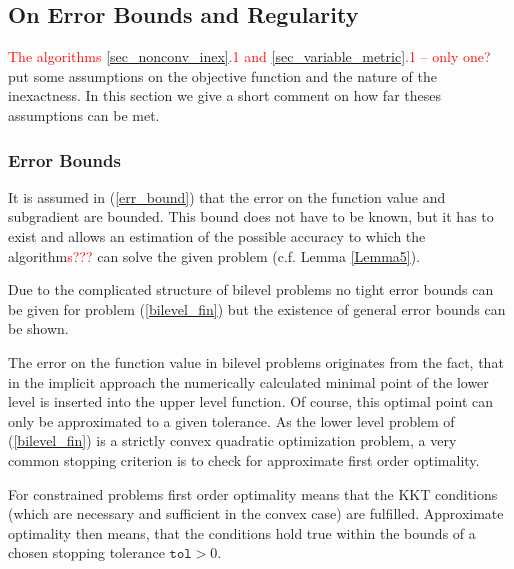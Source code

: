 
%


\subsection{On Error Bounds and Regularity}

\textcolor{red}{The algorithms \ref{sec_nonconv_inex}.1 and \ref{sec_variable_metric}.1 -- only one? } put some assumptions on the objective function and the nature of the inexactness. In this section we give a short comment on how far theses assumptions can be met.


\subsubsection{Error Bounds}

It is assumed in (\ref{err_bound}) that the error on the function value and subgradient are bounded. This bound does not have to be known, but it has to exist and allows an estimation of the possible accuracy to which the algorithm\textcolor{red}{s???} can solve the given problem (c.f. Lemma \ref{Lemma5}).

Due to the complicated structure of bilevel problems no tight error bounds can be given for problem (\ref{bilevel_fin}) but the existence of general error bounds can be shown.


The error on the function value in bilevel problems originates from the fact, that in the implicit approach the numerically calculated minimal point of the lower level is inserted into the upper level function.
Of course, this optimal point can only be approximated to a given tolerance.
As the lower level problem of (\ref{bilevel_fin}) is a strictly convex quadratic optimization problem, a very common stopping criterion is to check for approximate first order optimality.

For constrained problems first order optimality means that the KKT conditions (which are necessary and sufficient in the convex case) are fulfilled.
Approximate optimality then means, that the conditions hold true within the bounds of a chosen stopping tolerance \(\mathtt{tol}
 >0\).

